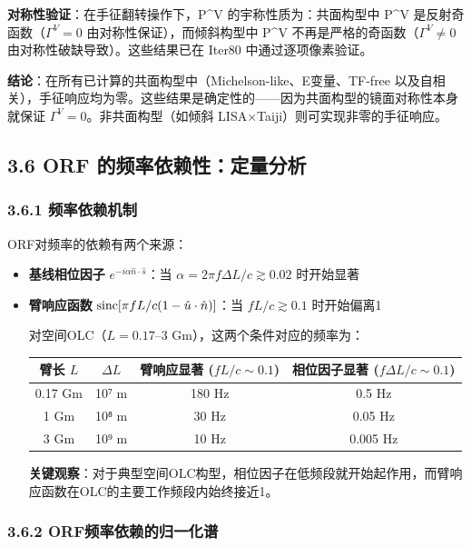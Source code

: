 \documentclass[12pt,a4paper]{article}
\begin{document}
\textbf{对称性验证}：在手征翻转操作下，P^V 的宇称性质为：共面构型中 P^V 是反射奇函数（$\Gamma^V = 0$ 由对称性保证），而倾斜构型中 P^V 不再是严格的奇函数（$\Gamma^V \neq 0$ 由对称性破缺导致）。这些结果已在 Iter80 中通过逐项像素验证。

\textbf{结论}：在所有已计算的共面构型中（Michelson-like、E变量、TF-free 以及自相关），手征响应均为零。这些结果是确定性的——因为共面构型的镜面对称性本身就保证 $\Gamma^V = 0$。非共面构型（如倾斜 LISA×Taiji）则可实现非零的手征响应。

\subsection{3.6 ORF 的频率依赖性：定量分析}


\subsubsection{3.6.1 频率依赖机制}


ORF对频率的依赖有两个来源：

\begin{itemize}
  \item[1] \textbf{基线相位因子} $e^{-i\alpha \hat{n}\cdot\hat{s}}$：当 $\alpha = 2\pi f \Delta L / c \gtrsim 0.02$ 时开始显著
  \item[2] \textbf{臂响应函数} ${\rm sinc}[\pi f L/c(1-\hat{u}\cdot\hat{n})]$：当 $fL/c \gtrsim 0.1$ 时开始偏离1

对空间OLC（$L = 0.17$–3 Gm），这两个条件对应的频率为：

\begin{tabular}{|c|c|c|c|}
\hline
臂长 $L$ & $\Delta L$ & 臂响应显著 ($fL/c \sim 0.1$) & 相位因子显著 ($f\Delta L/c \sim 0.1$) \\
\hline
0.17 Gm & 10⁷ m & 180 Hz & 0.5 Hz \\
1 Gm & 10⁸ m & 30 Hz & 0.05 Hz \\
3 Gm & 10⁹ m & 10 Hz & 0.005 Hz \\
\hline
\end{tabular}


\textbf{关键观察}：对于典型空间OLC构型，相位因子在低频段就开始起作用，而臂响应函数在OLC的主要工作频段内始终接近1。

\end{itemize}
\subsubsection{3.6.2 ORF频率依赖的归一化谱}
\end{document}
